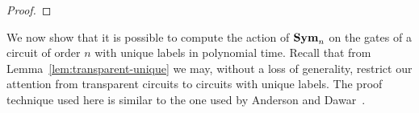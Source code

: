 \documentclass[../paper.tex]{subfiles}
\begin{document}
\begin{proof}
  

  

\end{proof}

We now show that it is possible to compute the action of $\text{\textbf{Sym}}_n$ on the gates
of a circuit of order $n$ with unique labels in polynomial time. Recall that
from Lemma~\ref{lem:transparent-unique} we may, without a loss of generality,
restrict our attention from transparent circuits to circuits with unique labels.
The proof technique used here is similar to the one used by Anderson and
Dawar~\cite{AndersonD17}.
\end{document}
